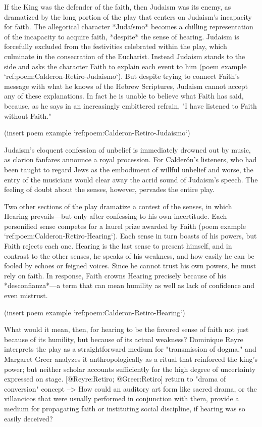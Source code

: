 If the King was the defender of the faith, then Judaism was its enemy, as
dramatized by the long portion of the play that centers on Judaism's incapacity
for faith.
The allegorical character *Judaísmo* becomes a chilling representation of the
incapacity to acquire faith, *despite* the sense of hearing. 
Judaism is forcefully excluded from the festivities celebrated within the play,
which culminate in the consecration of the Eucharist. 
Instead Judaism stands to the side and asks the character Faith to explain each
event to him (poem example `ref:poem:Calderon-Retiro-Judaismo`).
But despite trying to connect Faith's message with what he knows of the Hebrew
Scriptures, Judaism cannot accept any of these explanations. 
In fact he is unable to believe what Faith has said, because, as he says in an
increasingly embittered refrain, "I have listened to Faith without Faith." 

(insert poem example `ref:poem:Calderon-Retiro-Judaismo`)
\label{poem:Calderon-Retiro-Judaismo}

Judaism's eloquent confession of unbelief is immediately drowned out by music,
as clarion fanfares announce a royal procession. 
For Calderón's listeners, who had been taught to regard Jews as the embodiment
of willful unbelief and worse, the entry of the musicians would clear away the
acrid sound of Judaism's speech. 
The feeling of doubt about the senses, however, pervades the entire play. 

Two other sections of the play dramatize a contest of the senses, in which
Hearing prevails---but only after confessing to his own incertitude. 
Each personified sense competes for a laurel prize awarded by Faith (poem
example `ref:poem:Calderon-Retiro-Hearing`). 
Each sense in turn boasts of his powers, but Faith rejects each one. 
Hearing is the last sense to present himself, and in contrast to the other
senses, he speaks of his weakness, and how easily he can be fooled by echoes or
feigned voices. 
Since he cannot trust his own powers, he must rely on faith. 
In response, Faith crowns Hearing precisely because of his *desconfianza*---a
term that can mean humility as well as lack of confidence and even mistrust.

(insert poem example `ref:poem:Calderon-Retiro-Hearing`)
\label{poem:Calderon-Retiro-Hearing}

What would it mean, then, for hearing to be the favored sense of faith not just
because of its humility, but because of its actual weakness? 
Dominique Reyre interprets the play as a straightforward medium for
"transmission of dogma," and Margaret Greer analyzes it anthropologically as a
ritual that reinforced the king's power; but neither scholar accounts
sufficiently for the high degree of uncertainty expressed on stage.
[@Reyre:Retiro; @Greer:Retiro]
return to "drama of conversion" concept -->
How could an auditory art form like sacred drama, or the villancicos that
were usually performed in conjunction with them, provide a medium for
propagating faith or instituting social discipline, if hearing was so easily
deceived?

